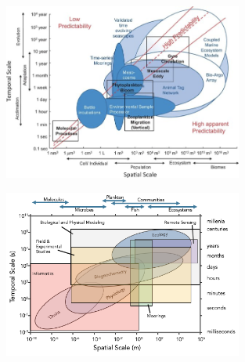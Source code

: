 \begin{figure}[!t]
  \centering
  \includegraphics[width=0.7\textwidth]{fig/bio-processes.png}
  \caption{}
  \label{fig:platforms1}
\end{figure}

\begin{figure}[!t]
  \centering
  \includegraphics[width=0.7\textwidth]{fig/spatio-temporal.png}
  \caption{}
  \label{fig:platforms2}
\end{figure}



